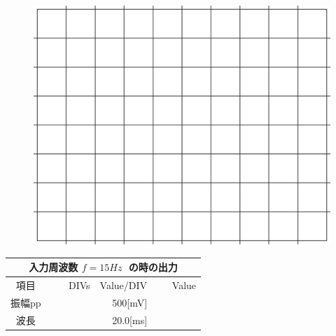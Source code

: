 \documentclass[uplatex,a4paper,11pt,oneside,openany]{jsbook}
\begin{document}
\begin{multicols}{2}
  \begin{figure}[H]
     \centering
      \includegraphics[keepaspectratio, scale=0.28, angle=0]
                  {figs/eps/grid.eps}
                  \label{fig:grid6mV}
  \end{figure}

  \begin{spacing}{1.5}
  \begin{tabular}{|c||r|r|r|}
    \multicolumn{4}{c}{入力周波数 $f=15Hz\;$ の時の出力} \\ \hline
    項目 & DIVs & Value/DIV & Value \\ \hline \hline
    振幅pp & 　　　　 & 500[mV]& 　　　　 \\ \hline
    波長 & 　　　　 & 20.0[ms]& 　　　　 \\ \hline
  \end{tabular}
\end{spacing}
\end{multicols}

\vfill
\end{document}
